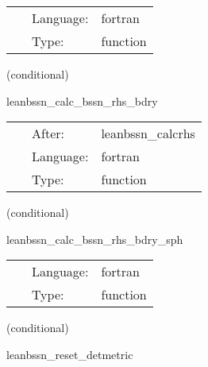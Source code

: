  \begin{tabular*}{160mm}{cll} 
~ & Language:  & fortran \\ 
~ & Type:  & function \\ 
\end{tabular*} 


\vspace{5mm}

   (conditional) 

\hspace{5mm} leanbssn\_calc\_bssn\_rhs\_bdry 

\hspace{5mm}{\it mol boundary rhs calculation } 


\hspace{5mm}

 \begin{tabular*}{160mm}{cll} 
~ & After:  & leanbssn\_calcrhs \\ 
~ & Language:  & fortran \\ 
~ & Type:  & function \\ 
\end{tabular*} 


\vspace{5mm}

   (conditional) 

\hspace{5mm} leanbssn\_calc\_bssn\_rhs\_bdry\_sph 

\hspace{5mm}{\it mol boundary rhs calculation in spherical coordinates } 


\hspace{5mm}

 \begin{tabular*}{160mm}{cll} 
~ & Language:  & fortran \\ 
~ & Type:  & function \\ 
\end{tabular*} 


\vspace{5mm}

   (conditional) 

\hspace{5mm} leanbssn\_reset\_detmetric 

\hspace{5mm}{\it reset dethh = 1 } 


\hspace{5mm}

